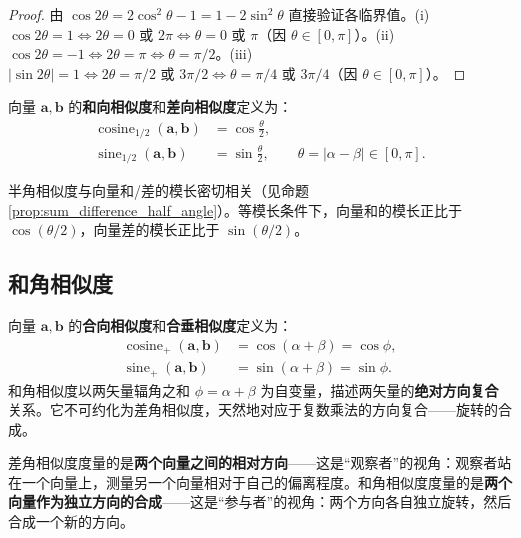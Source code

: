 \begin{proof}
由 $\cos 2\theta = 2\cos^2\theta - 1 = 1 - 2\sin^2\theta$ 直接验证各临界值。(i) $\cos 2\theta = 1 \iff 2\theta = 0 \text{ 或 } 2\pi \iff \theta = 0 \text{ 或 } \pi$（因 $\theta \in [0,\pi]$）。(ii) $\cos 2\theta = -1 \iff 2\theta = \pi \iff \theta = \pi/2$。(iii) $\lvert\sin 2\theta\rvert = 1 \iff 2\theta = \pi/2 \text{ 或 } 3\pi/2 \iff \theta = \pi/4 \text{ 或 } 3\pi/4$（因 $\theta \in [0,\pi]$）。
\end{proof}

\begin{definition}[半角差角相似度]\label{def:half_diff_similarity}
向量 $\mathbf{a}, \mathbf{b}$ 的\textbf{和向相似度}和\textbf{差向相似度}定义为：
\begin{align*}
\operatorname{cosine}_{1/2}(\mathbf{a}, \mathbf{b}) &= \cos\frac{\theta}{2}, \\
\operatorname{sine}_{1/2}(\mathbf{a}, \mathbf{b}) &= \sin\frac{\theta}{2}, \qquad \theta = \lvert\alpha-\beta\rvert \in [0,\pi].
\end{align*}
\end{definition}

\begin{remark}\label{rem:half_angle_sum_difference}
半角相似度与向量和/差的模长密切相关（见命题 \ref{prop:sum_difference_half_angle}）。等模长条件下，向量和的模长正比于 $\cos(\theta/2)$，向量差的模长正比于 $\sin(\theta/2)$。
\end{remark}

\subsection{\texorpdfstring{和角相似度}{和角相似度}}

\begin{definition}[基础和角相似度]\label{def:basic_sum_similarity}
向量 $\mathbf{a}, \mathbf{b}$ 的\textbf{合向相似度}和\textbf{合垂相似度}定义为：
\begin{align*}
\operatorname{cosine}_+(\mathbf{a}, \mathbf{b}) &= \cos(\alpha + \beta) = \cos\phi, \\
\operatorname{sine}_+(\mathbf{a}, \mathbf{b}) &= \sin(\alpha + \beta) = \sin\phi.
\end{align*}
和角相似度以两矢量辐角之和 $\phi = \alpha + \beta$ 为自变量，描述两矢量的\textbf{绝对方向复合}关系。它不可约化为差角相似度，天然地对应于复数乘法的方向复合——旋转的合成。
\end{definition}

\begin{remark}[差角与和角的本质区别]\label{rem:diff_sum_distinction}
差角相似度度量的是\textbf{两个向量之间的相对方向}——这是“观察者”的视角：观察者站在一个向量上，测量另一个向量相对于自己的偏离程度。和角相似度度量的是\textbf{两个向量作为独立方向的合成}——这是“参与者”的视角：两个方向各自独立旋转，然后合成一个新的方向。
\end{remark}

